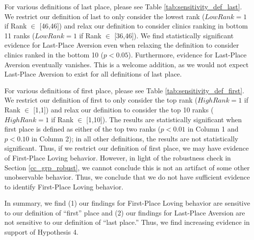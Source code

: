 For various definitions of last place, please see Table \ref{tab:sensitivity_def_last}. We restrict our definition of last to only consider the lowest rank ($LowRank = 1$ if Rank $\in$ [46,46]) and relax our definition to consider clinics ranking in bottom 11 ranks ($LowRank = 1$ if Rank $\in$ [36,46]). We find statistically significant evidence for Last-Place Aversion even when relaxing the definition to consider clinics ranked in the bottom 10 ($p < 0.05$). Furthermore, evidence for Last-Place Aversion eventually vanishes. This is a welcome addition, as we would not expect Last-Place Aversion to exist for all definitions of last place. 

For various definitions of first place, please see Table \ref{tab:sensitivity_def_first}. We restrict our definition of first to only consider the top rank ($HighRank = 1$ if Rank $\in$ [1,1]) and relax our definition to consider the top 10 ranks ($HighRank = 1$ if Rank $\in$ [1,10]). The results are statistically significant when first place is defined as either of the top two ranks ($p < 0.01$ in Column 1 and $p < 0.10$ in Column 2); in all other definitions, the results are not statistically significant. Thus, if we restrict our definition of first place, we may have evidence of First-Place Loving behavior. However, in light of the robustness check in Section \ref{cc_grp_robust}, we cannot conclude this is not an artifact of some other unobservable behavior. Thus, we conclude that we do not have sufficient evidence to identify First-Place Loving behavior.

In summary, we find (1) our findings for First-Place Loving behavior are sensitive to our definition of “first” place and (2) our findings for Last-Place Aversion are not sensitive to our definition of “last place.” Thus, we find increasing evidence in support of Hypothesis 4. 


